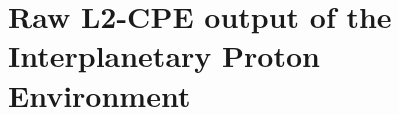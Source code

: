 \documentclass{hitec}
\begin{document}
\section{Raw L2-CPE output of the Interplanetary Proton Environment}
\label{App:Raw L2-CPE output of the Interplanetary Proton Environment}



%
%
\end{document}
